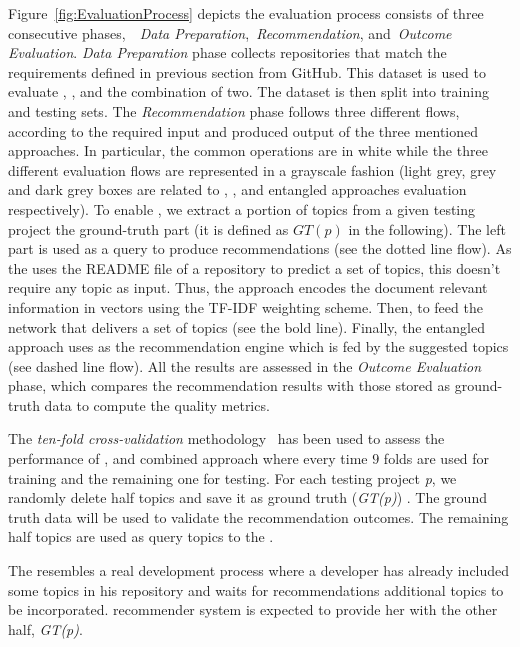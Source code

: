 Figure~\ref{fig:EvaluationProcess} depicts the evaluation process consists of three consecutive phases,~\ie~\emph{Data Preparation},~\emph{Recommendation}, and~\emph{Outcome Evaluation}. \emph{Data Preparation} phase collects repositories that match the requirements defined in previous section from GitHub. This dataset is used to evaluate \CT, \MNB, and the combination of two. 
The dataset is then split into training and testing sets. The 
\emph{Recommendation} phase follows three different flows, according to the required input and produced output of the three mentioned approaches. In particular, the common operations are in white while the three different evaluation flows are represented in a grayscale fashion (\ie light grey, grey and dark grey boxes are related to \CT, \MNB, and entangled approaches evaluation respectively).
To enable \CT, we extract a portion of topics from a given testing project \ie the ground-truth part (it is defined as $GT(p)$ in the following). The left part is used as a query to produce recommendations (see the dotted line flow). As the \MNB uses the README file of a repository to predict a set of topics, this doesn't require any topic as input. Thus, the approach encodes the document relevant information in vectors using the TF-IDF weighting scheme. Then, to feed the network that delivers a set of topics (see the bold line). Finally, the entangled approach uses \CT as the recommendation engine which is fed by the \MNB suggested topics (see dashed line flow). All the results are assessed in the \emph{Outcome Evaluation} phase, which compares the recommendation results with those stored as ground-truth data to compute the quality metrics. 


The \emph{ten-fold cross-validation} methodology~\cite{kohavi1995study} has been used to assess the performance of \CT, \MNB and combined approach where every time $9$ folds 
are used for training and the remaining one for testing.
For each testing project \emph{p}, we randomly delete half topics and save it as ground truth (\emph{GT(p)}) . The ground truth data  will be used to validate the recommendation outcomes. The remaining half topics are used as query topics to the \CT.%

The  resembles a real development process where a developer has already included some topics in his repository and waits for recommendations \ie additional topics to be incorporated. \CT recommender system is expected to provide her with the other half, \ie \emph{GT(p)}. 

